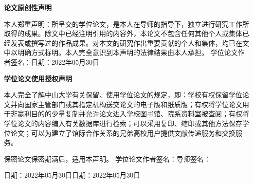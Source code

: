 \begin{center}
	\vspace*{20pt}
	\bfseries 论文原创性声明
\end{center}
\fontsize{15}{20}\selectfont

本人郑重声明：所呈交的学位论文，是本人在导师的指导下，独立进行研究工作所取得的成果。除文中已经注明引用的内容外，本论文不包含任何其他个人或集体已经发表或撰写过的作品成果。对本文的研究作出重要贡献的个人和集体，均已在文中以明确方式标明。本人完全意识到本声明的法律结果由本人承担。
\vskip 20pt
\noindent
学位论文作者签名：\qquad\qquad\qquad\qquad 日期：2022年05月30日

\vskip 70pt

\begin{center}
	{\bfseries 学位论文使用授权声明}
\end{center}

本人完全了解中山大学有关保留、使用学位论文的规定，即：学校有权保留学位论文并向国家主管部门或其指定机构送交论文的电子版和纸质版；有权将学位论文用于非赢利目的的少量复制并允许论文进入学校图书馆、院系资料室被查阅；有权将学位论文的内容编入有关数据库进行检索；可以采用复印、缩印或其他方法保存学位论文；可以为建立了馆际合作关系的兄弟高校用户提供文献传递服务和交换服务。

保密论文保密期满后，适用本声明。
\vskip 20pt
\noindent
学位论文作者签名：\qquad\qquad\qquad\qquad 导师签名：

\noindent
日期：2022年05月30日\qquad\qquad\qquad 日期：2022年05月30日

\endinput